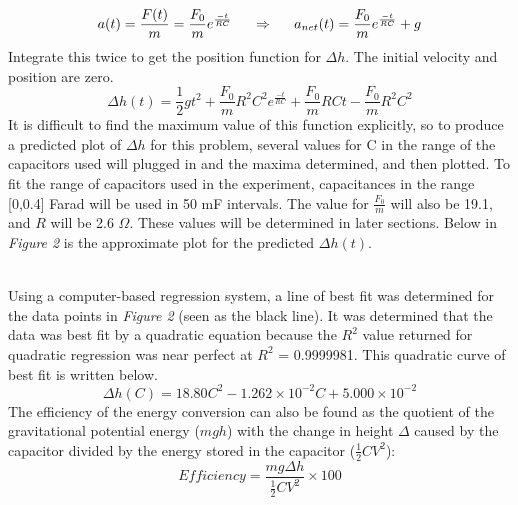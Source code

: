 \documentclass[12pt,letterpaper]{article}
\begin{document}
\begin{equation}
a(t)=\frac{F(t)}{m}=\frac{F_0}{m}e^\frac{-t}{RC} \hspace{0.2in}\Rightarrow\hspace{0.2in} a_{net}(t) = \frac{F_0}{m}e^\frac{-t}{RC} + g
\end{equation}
Integrate this twice to get the position function for $\Delta h$. The initial velocity and position are zero.
\begin{equation}
\Delta h(t) = \frac{1}{2}gt^2 + \frac{F_0}{m}R^2C^2e^\frac{-t}{RC} + \frac{F_0}{m}RCt-\frac{F_0}{m}R^2C^2
\end{equation}
It is difficult to find the maximum value of this function explicitly, so to produce a predicted plot of $\Delta h$ for this problem, several values for C in the range of the capacitors used will plugged in and the maxima determined, and then plotted. To fit the range of capacitors used in the experiment, capacitances in the range [0,0.4] Farad will be used in 50 mF intervals. The value for $\frac{F_0}{m}$ will also be 19.1, and $R$ will be 2.6 $\Omega$. These values will be determined in later sections. Below in \textit{Figure 2} is the approximate plot for the predicted $\Delta h(t)$.
\begin {figure}[htb!]
  \begin{center}
    	\resizebox{0.49\textwidth}{!}{}
  \end	{center}
\end {figure}\\
Using a computer-based regression system, a line of best fit was determined for the data points in \textit{Figure 2} (seen as the black line). It was determined that the data was best fit by a quadratic equation because the $R^2$ value returned for quadratic regression was near perfect at $R^2$ = 0.9999981. This quadratic curve of best fit is written below.
\begin{equation}
\Delta h(C) = 18.80C^2 - 1.262\times10^{-2}C + 5.000\times10^{-2}
\end{equation} 
The efficiency of the energy conversion can also be found as the quotient of the gravitational potential energy ($mgh$) with the change in height $\Delta$ caused by the capacitor divided by the energy stored in the capacitor ($\frac{1}{2}CV^2$):
\begin{equation}
Efficiency = \frac{mg\Delta h}{\frac{1}{2}CV^2}\times 100
\end{equation}
\end{document}
